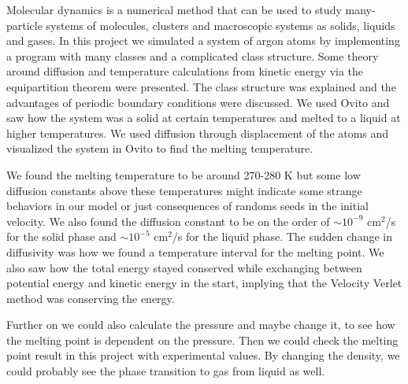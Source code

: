 Molecular dynamics is a numerical method that can be used to study many-particle systems of molecules, clusters and macroscopic systems as solids, liquids and gases. In this project we simulated a system of argon atoms by implementing a program with many classes and a complicated class structure. Some theory around diffusion and temperature calculations from kinetic energy via the equipartition theorem were presented. The class structure was explained and the advantages of periodic boundary conditions were discussed. We used Ovito and saw how the system was a solid at certain temperatures and melted to a liquid at higher temperatures. We used diffusion through displacement of the atoms and visualized the system in Ovito to find the melting temperature. 

We found the melting temperature to be around 270-280 K but some low diffusion constants above these temperatures might indicate some strange behaviors in our model or just consequences of randoms seeds in the initial velocity. We also found the diffusion constant to be on the order of $\sim 10^{-9}$ cm$^2$/s for the solid phase and $\sim 10^{-5}$ cm$^2$/s for the liquid phase. The sudden change in diffusivity was how we found a temperature interval for the melting point. We also saw how the total energy stayed conserved while exchanging between potential energy and kinetic energy in the start, implying that the Velocity Verlet method was conserving the energy. 

Further on we could also calculate the pressure and maybe change it, to see how the melting point is dependent on the pressure. Then we could check the melting point result in this project with experimental values. By changing the density, we could probably see the phase transition to gas from liquid as well. 
